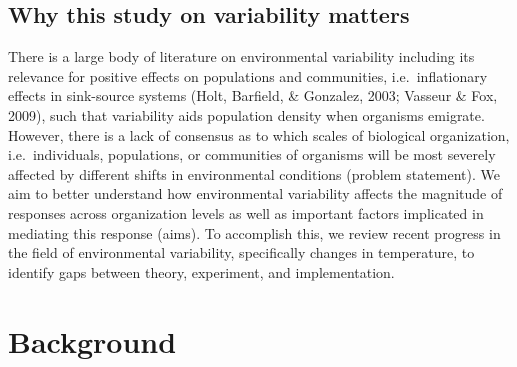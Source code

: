 \documentclass[12pt,twoside]{reedthesis}
\begin{document}
\hypertarget{why-this-study-on-variability-matters}{%
\section{Why this study on variability matters}\label{why-this-study-on-variability-matters}}

There is a large body of literature on environmental variability including its relevance for positive effects on populations and communities, i.e.~inflationary effects in sink-source systems (Holt, Barfield, \& Gonzalez, 2003; Vasseur \& Fox, 2009), such that variability aids population density when organisms emigrate. However, there is a lack of consensus as to which scales of biological organization, i.e.~individuals, populations, or communities of organisms will be most severely affected by different shifts in environmental conditions (problem statement). We aim to better understand how environmental variability affects the magnitude of responses across organization levels as well as important factors implicated in mediating this response (aims). To accomplish this, we review recent progress in the field of environmental variability, specifically changes in temperature, to identify gaps between theory, experiment, and implementation.

\hypertarget{background}{%
\chapter{Background}\label{background}}
\end{document}
